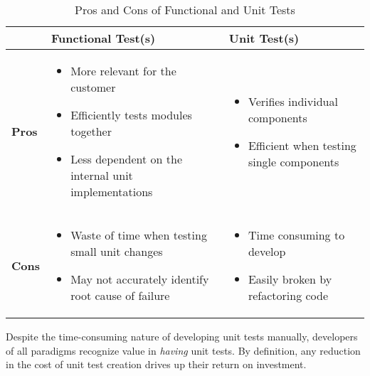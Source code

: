 \begin{table}[htbp]
    \caption{Pros and Cons of Functional and Unit Tests}
    \begin{center}
    \begin{tabular}{|>{\centering\arraybackslash}m{0.6cm}|>{\centering\arraybackslash}m{3.4cm}|>{\centering\arraybackslash}m{3.4cm}|}
        \hline
        \multirow{2}{*}{} & \textbf{Functional Test(s)} & \textbf{Unit Test(s)} \\
        \hline
        \textbf{Pros} & \begin{itemize}[leftmargin=*]
            \item More relevant for the customer
            \item Efficiently tests modules together
            \item Less dependent on the internal unit implementations
        \end{itemize} & \begin{itemize}[leftmargin=*]
            \item Verifies individual components
            \item Efficient when testing single components
        \end{itemize} \\
        \hline
        \textbf{Cons} & \begin{itemize}[leftmargin=*]
            \item Waste of time when testing small unit changes
            \item May not accurately identify root cause of failure
        \end{itemize} & \begin{itemize}[leftmargin=*]
            \item Time consuming to develop
            \item Easily broken by refactoring code
        \end{itemize} \\
        \hline
    \end{tabular}
    \label{tab1}
    \end{center}
\end{table}

Despite the time-consuming nature of developing unit tests manually, developers of all paradigms
recognize value in \textit{having} unit tests. By definition, any reduction in the cost of unit test creation drives 
up their return on investment.

